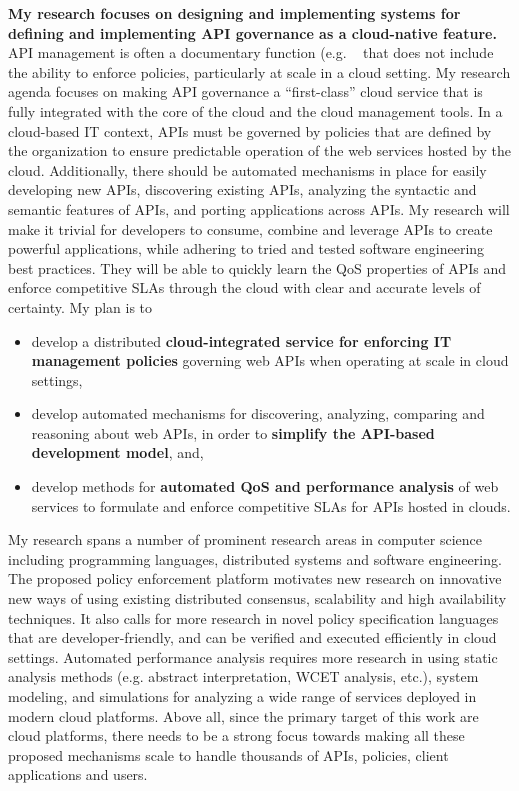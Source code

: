 {\bf My research focuses on designing and implementing systems for defining and
implementing 
API governance as a cloud-native feature.}  API management is often a
documentary function (e.g. ~\cite{apigee,layer7,wso2am} that does not include the ability to
enforce policies, particularly at scale in a cloud setting. 
My research agenda focuses on making API governance a ``first-class'' cloud
service that is fully integrated
with the core of the cloud and the cloud management tools. 
In a cloud-based IT context, APIs must be governed by
policies that are defined by the organization to ensure predictable
operation of the web services hosted by the cloud. Additionally,
there should be automated mechanisms in place for easily developing new
APIs, discovering existing APIs, analyzing the syntactic and semantic features
of APIs, and porting applications across APIs. My research will make 
it trivial for developers to consume, combine and leverage APIs to create powerful
applications, while adhering to tried and tested software engineering 
best practices. They will be able to quickly learn
the QoS properties of APIs and enforce competitive SLAs through the cloud
with clear and accurate levels of certainty. My plan is to
\begin{itemize}
\item develop a distributed {\bf cloud-integrated service for enforcing IT 
management policies} governing
web APIs when operating at scale in cloud settings,
\item develop automated mechanisms for discovering, analyzing, comparing and reasoning
about web APIs, in order to {\bf simplify the API-based development model}, and,
\item develop methods for {\bf automated QoS and performance analysis} of web services
to formulate and enforce competitive SLAs for APIs hosted in clouds.
\end{itemize}

My research spans a number of prominent research areas in computer
science including programming languages, 
distributed systems and software engineering. The proposed policy enforcement
platform motivates new research on innovative new ways of using existing
distributed consensus, scalability and high availability techniques. It also calls for
more research in novel policy specification languages that
are developer-friendly, and can be verified and executed efficiently in cloud settings.
Automated performance analysis requires more research in using
static analysis methods (e.g. abstract interpretation, WCET analysis, etc.), system modeling,
and simulations for analyzing a wide range of services deployed in modern cloud platforms.
Above all, since the primary target of this
work are cloud platforms, there needs to be a strong focus towards making all these 
proposed mechanisms scale to handle thousands of APIs, policies, client applications and users.

